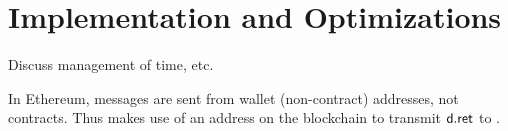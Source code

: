 \section{Implementation and Optimizations}

Discuss management of time, etc.

In Ethereum, messages are sent from wallet (non-contract) addresses, not contracts. Thus \tc makes use of an address \tcadd on the blockchain to transmit ${\sf d.ret}$ to \tcont. 
